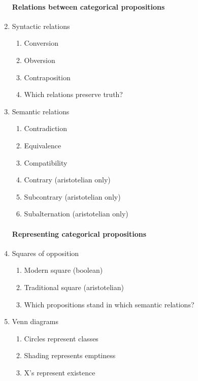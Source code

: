 \documentclass[10pt,landscape]{article}
\begin{document}
\begin{multicols}{2}
\begin{enumerate}
\paragraph{Relations between categorical propositions}
    \item Syntactic relations
      \begin{enumerate}
       \item Conversion
       \item Obversion
       \item Contraposition
       \item Which relations preserve truth?
      \end{enumerate}
    \item Semantic relations
      \begin{enumerate}
       \item Contradiction
       \item Equivalence
       \item Compatibility
       \item Contrary (aristotelian only)
       \item Subcontrary (aristotelian only)
       \item Subalternation (aristotelian only)
      \end{enumerate}

\paragraph{Representing categorical propositions}
    \item Squares of opposition
      \begin{enumerate}
       \item Modern square (boolean)
       \item Traditional square (aristotelian)
       \item Which propositions stand in which semantic relations?
      \end{enumerate}
    \item Venn diagrams
      \begin{enumerate}
       \item Circles represent classes
       \item Shading represents emptiness
       \item X's represent existence
      \end{enumerate}
  

\end{enumerate}
\end{multicols}
\end{document}

